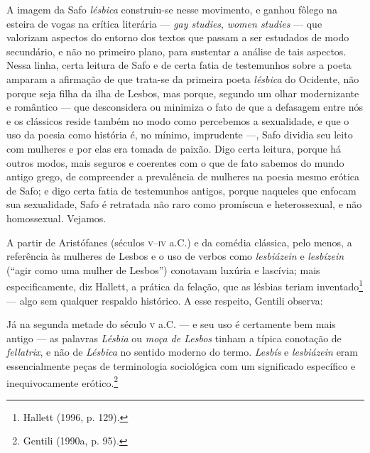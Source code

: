 A imagem da Safo \textit{lésbica} construiu-se nesse movimento, e ganhou fôlego
na esteira de vogas na crítica literária --- \textit{gay studies}, \textit{women
studies} --- que valorizam aspectos do entorno dos textos que passam a ser
estudados de modo secundário, e não no primeiro plano, para sustentar a análise
de tais aspectos. Nessa linha, certa leitura de Safo e de certa fatia de
testemunhos sobre a poeta amparam a afirmação de que trata-se da primeira poeta
\textit{lésbica} do Ocidente, não porque seja filha da ilha de Lesbos, mas
porque, segundo um olhar modernizante e romântico --- que
desconsidera ou minimiza o fato de que a defasagem entre nós e os clássicos
reside também no modo como percebemos a sexualidade, e que o uso da poesia como
história é, no mínimo, imprudente ---, Safo dividia seu leito com mulheres e por
elas era tomada de paixão. Digo certa leitura, porque há outros modos, mais
seguros e coerentes com o que de fato sabemos do mundo antigo grego, de
compreender a prevalência de mulheres na poesia mesmo erótica de Safo; e digo
certa fatia de testemunhos antigos, porque naqueles que enfocam sua
sexualidade, Safo é retratada não raro como promíscua e heterossexual, e não
homossexual. Vejamos. 

A partir de Aristófanes (séculos \textsc{v}--\textsc{iv} a.C.) e da comédia clássica, pelo menos, a
referência às mulheres de Lesbos e o uso de verbos como \textit{lesbiázein} e
\textit{lesbízein} (“agir como uma mulher de Lesbos”) conotavam luxúria e
lascívia; mais especificamente, diz Hallett, a prática da
felação, que as lésbias teriam inventado\footnote{ Hallett (1996, p. 129).} --- algo sem qualquer respaldo
histórico. A esse respeito, Gentili observa: 

\begin{hedraquote}
Já na segunda metade do século \textsc{v} a.C. --- e seu uso é certamente bem mais antigo
--- as palavras \textit{Lésbia} ou \textit{moça de Lesbos} tinham a típica
conotação de \textit{fellatrix}, e não de \textit{Lésbica} no sentido moderno
do termo. \textit{Lesbís} e \textit{lesbiázein} eram essencialmente peças de
terminologia sociológica com um significado específico e inequivocamente
erótico.\footnote{ Gentili (1990a, p. 95).}
\end{hedraquote}

